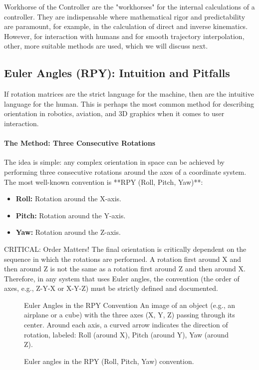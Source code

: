 \begin{tipbox}{Workhorse of the Controller}
 are the "workhorses" for the internal calculations of a controller. They are indispensable where mathematical rigor and predictability are paramount, for example, in the calculation of direct and inverse kinematics. However, for interaction with humans and for smooth trajectory interpolation, other, more suitable methods are used, which we will discuss next.
\end{tipbox}

\subsection{Euler Angles (RPY): Intuition and Pitfalls}
\label{sec:euler_angles}

If rotation matrices are the strict language for the machine, then  are the intuitive language for the human. This is perhaps the most common method for describing orientation in robotics, aviation, and 3D graphics when it comes to user interaction.

\paragraph{The Method: Three Consecutive Rotations}
The idea is simple: any complex orientation in space can be achieved by performing three consecutive rotations around the axes of a coordinate system. The most well-known convention is **RPY (Roll, Pitch, Yaw)**:
\begin{itemize}
    \item \textbf{Roll:} Rotation around the X-axis.
    \item \textbf{Pitch:} Rotation around the Y-axis.
    \item \textbf{Yaw:} Rotation around the Z-axis.
\end{itemize}

\begin{dangerbox}{CRITICAL: Order Matters!}
The final orientation is critically dependent on the sequence in which the rotations are performed. A rotation first around X and then around Z is not the same as a rotation first around Z and then around X. Therefore, in any system that uses Euler angles, the convention (the order of axes, e.g., Z-Y-X or X-Y-Z) must be strictly defined and documented.
\end{dangerbox}

\begin{figure}[h!]
    \centering
    \begin{tcolorbox}{Euler Angles in the RPY Convention}
        An image of an object (e.g., an airplane or a cube) with the three axes (X, Y, Z) passing through its center. Around each axis, a curved arrow indicates the direction of rotation, labeled: Roll (around X), Pitch (around Y), Yaw (around Z).
    \end{tcolorbox}
    \caption{Euler angles in the RPY (Roll, Pitch, Yaw) convention.}
    \label{fig:rpy_angles}
\end{figure}

